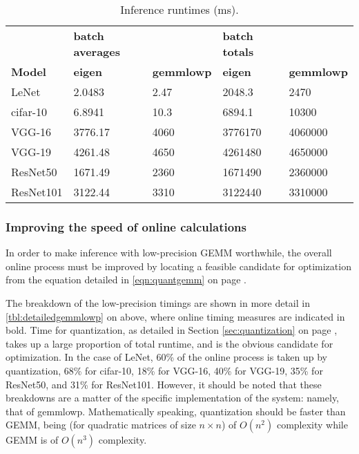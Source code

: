 \begin{table}[]
\centering
\caption[Inference runtimes]{Inference runtimes (ms).}
\label{tbl:runtime}
\begin{tabular}{lllll}
& \textbf{batch averages}   &                              & \textbf{batch totals}     &     \\
\textbf{Model} & \textbf{eigen} & \textbf{gemmlowp} & \textbf{eigen} & \textbf{gemmlowp} \\
LeNet          & 2.0483         & 2.47              & 2048.3         & 2470              \\
cifar-10       & 6.8941         & 10.3              & 6894.1         & 10300             \\
VGG-16         & 3776.17        & 4060              & 3776170        & 4060000           \\
VGG-19        & 4261.48        & 4650              & 4261480        & 4650000           \\
ResNet50       & 1671.49        & 2360              & 1671490        & 2360000           \\
ResNet101      & 3122.44        & 3310              & 3122440        & 3310000          
\end{tabular}
\end{table}

\subsubsection{Improving the speed of online calculations}
In order to make inference with low-precision GEMM worthwhile, the overall online process must be improved by locating a feasible candidate for optimization from the equation detailed in \ref{eqn:quantgemm} on page \pageref{eqn:quantgemm}.

The breakdown of the low-precision timings are shown in more detail in \ref{tbl:detailedgemmlowp} on above, where online timing measures are indicated in bold. Time for quantization, as detailed in Section \ref{sec:quantization} on page \pageref{sec:quantization}, takes up a large proportion of total runtime, and is the obvious candidate for optimization. In the case of LeNet, 60\% of the online process is taken up by quantization, 68\% for cifar-10, 18\% for VGG-16, 40\% for VGG-19, 35\% for ResNet50, and 31\% for ResNet101. However, it should be noted that these breakdowns are a matter of the specific implementation of the system: namely, that of gemmlowp. Mathematically speaking, quantization should be faster than GEMM, being (for quadratic matrices of size $n\times n$) of $O(n^{2})$ complexity while GEMM is of $O(n^{3})$ complexity.


